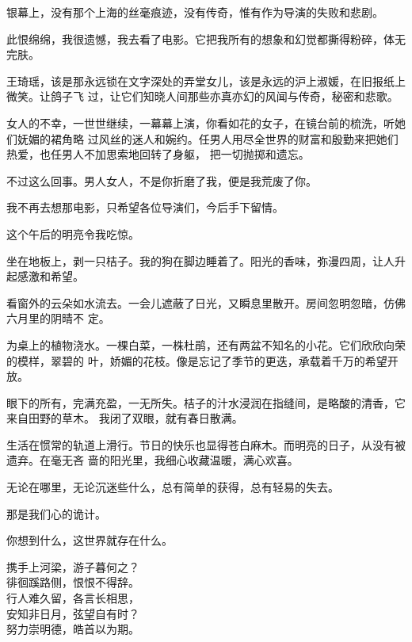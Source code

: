 		银幕上，没有那个上海的丝毫痕迹，没有传奇，惟有作为导演的失败和悲剧。

		此恨绵绵，我很遗憾，我去看了电影。它把我所有的想象和幻觉都撕得粉碎，体无完肤。


		王琦瑶，该是那永远锁在文字深处的弄堂女儿，该是永远的沪上淑媛，在旧报纸上微笑。让鸽子飞
	过，让它们知晓人间那些亦真亦幻的风闻与传奇，秘密和悲歌。

		女人的不幸，一世世继续，一幕幕上演，你看如花的女子，在镜台前的梳洗，听她们妩媚的裙角略
	过风丝的迷人和婉约。任男人用尽全世界的财富和殷勤来把她们热爱，也任男人不加思索地回转了身躯，
	把一切抛掷和遗忘。

		不过这么回事。男人女人，不是你折磨了我，便是我荒废了你。

		我不再去想那电影，只希望各位导演们，今后手下留情。

	\endwriting



		这个午后的明亮令我吃惊。

		坐在地板上，剥一只桔子。我的狗在脚边睡着了。阳光的香味，弥漫四周，让人升起感激和希望。

		看窗外的云朵如水流去。一会儿遮蔽了日光，又瞬息里散开。房间忽明忽暗，仿佛六月里的阴晴不
	定。

		为桌上的植物浇水。一棵白菜，一株杜鹃，还有两盆不知名的小花。它们欣欣向荣的模样，翠碧的
	叶，娇媚的花枝。像是忘记了季节的更迭，承载着千万的希望开放。

		眼下的所有，完满充盈，一无所失。桔子的汁水浸润在指缝间，是略酸的清香，它来自田野的草木。
	我闭了双眼，就有春日散满。

		生活在惯常的轨道上滑行。节日的快乐也显得苍白麻木。而明亮的日子，从没有被遗弃。在毫无吝
	啬的阳光里，我细心收藏温暖，满心欢喜。

		无论在哪里，无论沉迷些什么，总有简单的获得，总有轻易的失去。

		那是我们心的诡计。

		你想到什么，这世界就存在什么。

	\endwriting



		\shortpoem{}{}{}
			携手上河梁，游子暮何之？\\
			徘徊蹊路侧，恨恨不得辞。\\
			行人难久留，各言长相思，\\
			安知非日月，弦望自有时？\\
			努力崇明德，皓首以为期。\\
		\endshortpoem

